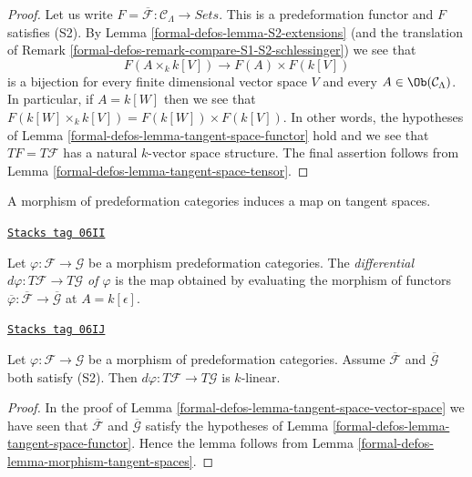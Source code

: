 \begin{proof}
Let us write
$F = \overline{\mathcal{F}} : \mathcal{C}_\Lambda \to \textit{Sets}$.
This is a predeformation functor and $F$ satisfies (S2). By
Lemma \ref{formal-defos-lemma-S2-extensions}
(and the translation of
Remark \ref{formal-defos-remark-compare-S1-S2-schlessinger})
we see that
$$
F(A \times_k k[V]) \longrightarrow F(A) \times F(k[V])
$$
is a bijection for every finite dimensional vector space $V$ and every
$A \in \Ob(\mathcal{C}_\Lambda)$. In particular, if $A = k[W]$
then we see that $F(k[W] \times_k k[V]) = F(k[W]) \times F(k[V])$.
In other words, the hypotheses of
Lemma \ref{formal-defos-lemma-tangent-space-functor}
hold and we see that $TF = T \mathcal{F}$
has a natural $k$-vector space structure.
The final assertion follows from
Lemma \ref{formal-defos-lemma-tangent-space-tensor}.
\end{proof}

A morphism of predeformation categories induces a map on tangent spaces.

\begin{definition}[Differential]
\label{formal-defos-definition-differential}
\href{https://stacks.math.columbia.edu/tag/06II}{\texttt{Stacks tag 06II}}

Let $\varphi : \mathcal{F} \to \mathcal{G}$ be a morphism predeformation
categories. The
{\it differential $d \varphi : T \mathcal{F} \to T \mathcal{G}$ of $\varphi$}
is the map obtained by evaluating the morphism of functors
$\overline{\varphi}: \overline{\mathcal{F}} \to \overline{\mathcal{G}}$
at $A = k[\epsilon]$.
\end{definition}

\begin{lemma}
\label{formal-defos-lemma-k-linear-differential}
\href{https://stacks.math.columbia.edu/tag/06IJ}{\texttt{Stacks tag 06IJ}}

Let $\varphi : \mathcal{F} \to \mathcal{G}$ be a morphism of predeformation
categories. Assume $\overline{\mathcal{F}}$ and $\overline{\mathcal{G}}$ both
satisfy (S2). Then $d \varphi : T \mathcal{F} \to T \mathcal{G}$ is $k$-linear.
\end{lemma}

\begin{proof}
In the proof of
Lemma \ref{formal-defos-lemma-tangent-space-vector-space}
we have seen that $\overline{\mathcal{F}}$ and $\overline{\mathcal{G}}$
satisfy the hypotheses of
Lemma \ref{formal-defos-lemma-tangent-space-functor}.
Hence the lemma follows from
Lemma \ref{formal-defos-lemma-morphism-tangent-spaces}.
\end{proof}

